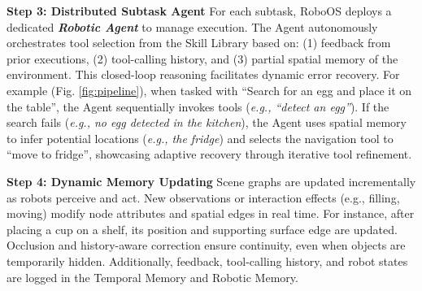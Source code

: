 \textbf{Step 3: Distributed Subtask Agent}  
For each subtask, RoboOS deploys a dedicated \textit{\textbf{Robotic Agent}} to manage execution. The Agent autonomously orchestrates tool selection from the Skill Library based on: (1) feedback from prior executions, (2) tool-calling history, and (3) partial spatial memory of the environment. This closed-loop reasoning facilitates dynamic error recovery.  
For example (Fig. \ref{fig:pipeline}), when tasked with ``Search for an egg and place it on the table'', the Agent sequentially invokes tools (\textit{e.g., ``detect an egg''}). If the search fails (\textit{e.g., no egg detected in the kitchen}), the Agent uses spatial memory to infer potential locations (\textit{e.g., the fridge}) and selects the navigation tool to ``move to fridge'', showcasing adaptive recovery through iterative tool refinement.

\textbf{Step 4: Dynamic Memory Updating}  
Scene graphs are updated incrementally as robots perceive and act. New observations or interaction effects (e.g., filling, moving) modify node attributes and spatial edges in real time. For instance, after placing a cup on a shelf, its position and supporting surface edge are updated. Occlusion and history-aware correction ensure continuity, even when objects are temporarily hidden.  
Additionally, feedback, tool-calling history, and robot states are logged in the Temporal Memory and Robotic Memory.

